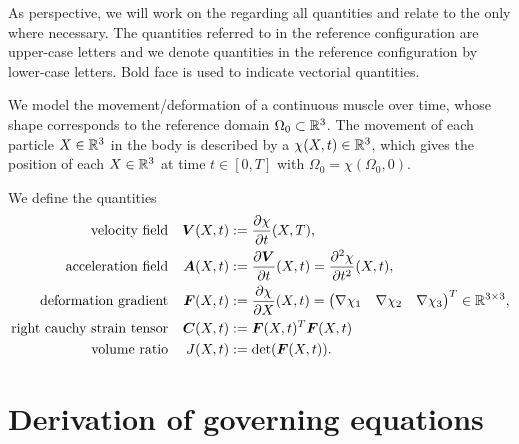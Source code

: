 \documentclass[a4paper,12pt]{article}
\newcommand{\Or}{\Omega_0}
\newcommand{\m}[1]{\ensuremath{\left(\begin{matrix}#1\end{matrix}\right)}}
\begin{document}
As perspective, we will work on the  regarding all quantities and relate to the  only where necessary.
The quantities referred to in the reference configuration are upper-case letters and we denote quantities in the reference configuration by lower-case letters.
Bold face is used to indicate vectorial quantities.

We model the movement/deformation of a continuous muscle over time, whose shape corresponds to the reference domain $\Or\subset\R^3$.
The movement of each particle $X\in\mathbb{R}^3$ in the body is described by a  $\chi(X,t)\in\mathbb{R}^3$, which gives the position of each $X\in\mathbb{R}^3$ at time
$t\in[0,T]$ with $\Or = \chi(\Or,0)$.

We define the quantities
\begin{align}
	\text{velocity field} && \vV(X,t) &:= \d{\chi}{t}(X,T),\\
	\text{acceleration field} && \vA(X,t) &:= \d{\vV}{t}(X,t) = \dd{\chi}{t}(X,t),\\
	\text{deformation gradient} && \vF(X,t) &:= \d{\chi}{X}(X,t) = \m{\nabla \chi_1 & \nabla \chi_2 & \nabla \chi_3}^T \in \R^{3\times 3},\\
	\text{right cauchy strain tensor} && \vC(X,t) &:= \vF(X,t)^T\vF(X,t)\\
	\text{volume ratio} && J(X,t) &:= \det(\vF(X,t)).
\end{align}

\section{Derivation of governing equations}

\end{document}
